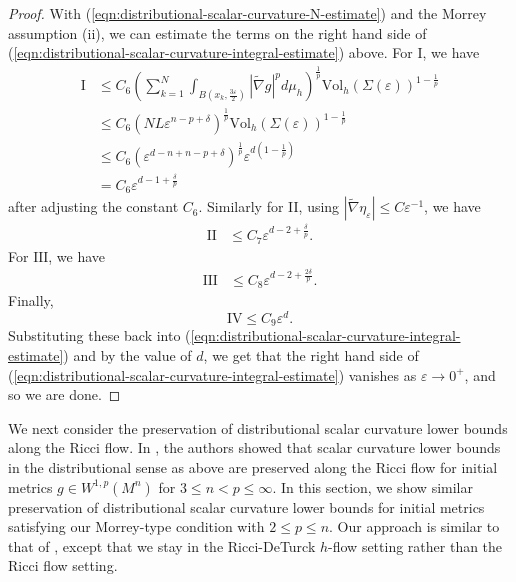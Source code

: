 \documentclass[12pt]{amsart}
\theoremstyle{plain}
\theoremstyle{plain}
\theoremstyle{definition}
\theoremstyle{remark}
\numberwithin{equation}{subsection}
\newcommand{\hdel}{\tilde{\nabla}}
\begin{document}
\begin{proof}
    With (\ref{eqn:distributional-scalar-curvature-N-estimate}) and the Morrey assumption (ii), we can estimate the terms on the right hand side of (\ref{eqn:distributional-scalar-curvature-integral-estimate}) above. For I, we have
    \begin{align*}
        \text{I} &\leq C_6\left(\sum\limits_{k=1}^N \int_{B(x_k,\frac{3\varepsilon}{2})}|\hdel g|^pd\mu_h\right)^\frac{1}{p}\text{Vol}_h(\Sigma(\varepsilon))^{1-\frac{1}{p}} \nonumber \\
        &\leq C_6\left(NL\varepsilon^{n-p+\delta}\right)^\frac{1}{p}\text{Vol}_h(\Sigma(\varepsilon))^{1-\frac{1}{p}} \nonumber \\
        &\leq C_6(\varepsilon^{d-n+n-p+\delta})^\frac{1}{p}\varepsilon^{d\left(1-\frac{1}{p}\right)} \nonumber \\
        &= C_6\varepsilon^{d-1+\frac{\delta}{p}}
    \end{align*}
    after adjusting the constant $C_6$. Similarly for II, using $|\hdel \eta_\varepsilon|\leq C\varepsilon^{-1}$, we have
    \begin{align*}
        \text{II} &\leq C_7 \varepsilon^{d-2+\frac{\delta}{p}}.
    \end{align*}
    For $\text{III}$, we have
    \begin{align*}
        \text{III} &\leq C_8\varepsilon^{d-2+\frac{2\delta}{p}}.
    \end{align*}
    Finally,
    \begin{equation*}
        \text{IV} \leq C_9\varepsilon^d.
    \end{equation*}
    Substituting these back into (\ref{eqn:distributional-scalar-curvature-integral-estimate}) and by the value of $d$, we get that the right hand side of (\ref{eqn:distributional-scalar-curvature-integral-estimate}) vanishes as $\varepsilon\to0^+$, and so we are done.
\end{proof}

We next consider the preservation of distributional scalar curvature lower bounds along the Ricci flow. In \cite{jiang_weak_2021}, the authors showed that scalar curvature lower bounds in the distributional sense as above are preserved along the Ricci flow for initial metrics $g \in W^{1,p}(M^n)$ for $3 \leq n < p \leq \infty$. In this section, we show similar preservation of distributional scalar curvature lower bounds for initial metrics satisfying our Morrey-type condition with $2 \leq p \leq n$. Our approach is similar to that of \cite{jiang_weak_2021}, except that we stay in the Ricci-DeTurck $h$-flow setting rather than the Ricci flow setting.
\end{document}
